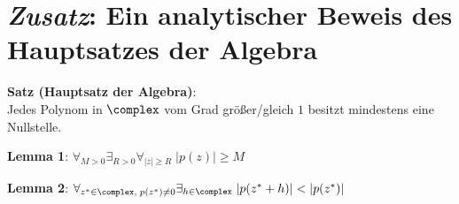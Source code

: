 \section{%
    \emph{Zusatz}: Ein analytischer Beweis des Hauptsatzes der Algebra%
}

\textbf{Satz (Hauptsatz der Algebra)}: \\
Jedes Polynom in $\complex$ vom Grad größer/gleich $1$ besitzt mindestens
eine Nullstelle.

\textbf{Lemma 1}:
$\forall_{M > 0} \exists_{R > 0} \forall_{|z| \ge R}\; |p(z)| \ge M$

\textbf{Lemma 2}:
$\forall_{z^\ast \in \complex,\; p(z^\ast) \not= 0} \exists_{h \in \complex}\;
|p(z^\ast + h)| < |p(z^\ast)|$

\pagebreak
